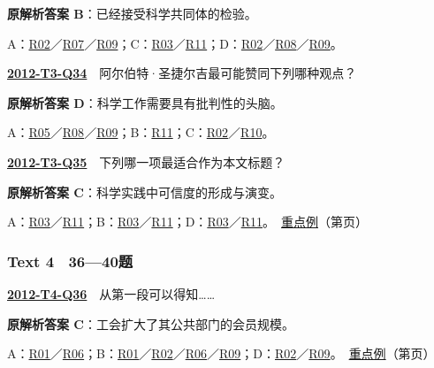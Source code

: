 \documentclass[11pt,a4paper]{article}
\begin{document}
\noindent\textbf{原解析答案 B}：已经接受科学共同体的检验。\par\nopagebreak
\noindent A：\hyperref[cat-R02]{R02}／\hyperref[cat-R07]{R07}／\hyperref[cat-R09]{R09}；C：\hyperref[cat-R03]{R03}／\hyperref[cat-R11]{R11}；D：\hyperref[cat-R02]{R02}／\hyperref[cat-R08]{R08}／\hyperref[cat-R09]{R09}。\par\smallskip
{}\label{idx-2012-T3-Q34}\noindent\textbf{\href{https://zj139.github.io/math-notes/english/8d32b42b276b1ab633d587b6/\#q34}{2012-T3-Q34}}　阿尔伯特·圣捷尔吉最可能赞同下列哪种观点？\par\nopagebreak
\noindent\textbf{原解析答案 D}：科学工作需要具有批判性的头脑。\par\nopagebreak
\noindent A：\hyperref[cat-R05]{R05}／\hyperref[cat-R08]{R08}／\hyperref[cat-R09]{R09}；B：\hyperref[cat-R11]{R11}；C：\hyperref[cat-R02]{R02}／\hyperref[cat-R10]{R10}。\par\smallskip
{}\label{idx-2012-T3-Q35}\noindent\textbf{\href{https://zj139.github.io/math-notes/english/8d32b42b276b1ab633d587b6/\#q35}{2012-T3-Q35}}　下列哪一项最适合作为本文标题？\par\nopagebreak
\noindent\textbf{原解析答案 C}：科学实践中可信度的形成与演变。\par\nopagebreak
\noindent A：\hyperref[cat-R03]{R03}／\hyperref[cat-R11]{R11}；B：\hyperref[cat-R03]{R03}／\hyperref[cat-R11]{R11}；D：\hyperref[cat-R03]{R03}／\hyperref[cat-R11]{R11}。　\hyperref[case-2012-T3-Q35]{重点例}（第\pageref{case-2012-T3-Q35}页）\par\smallskip
{}\subsubsection{Text 4　36—40题}
\label{idx-2012-T4-Q36}\noindent\textbf{\href{https://zj139.github.io/math-notes/english/2567aa708876e7f62db07164/\#q36}{2012-T4-Q36}}　从第一段可以得知……\par\nopagebreak
\noindent\textbf{原解析答案 C}：工会扩大了其公共部门的会员规模。\par\nopagebreak
\noindent A：\hyperref[cat-R01]{R01}／\hyperref[cat-R06]{R06}；B：\hyperref[cat-R01]{R01}／\hyperref[cat-R02]{R02}／\hyperref[cat-R06]{R06}／\hyperref[cat-R09]{R09}；D：\hyperref[cat-R02]{R02}／\hyperref[cat-R09]{R09}。　\hyperref[case-2012-T4-Q36]{重点例}（第\pageref{case-2012-T4-Q36}页）\par\smallskip
\end{document}
